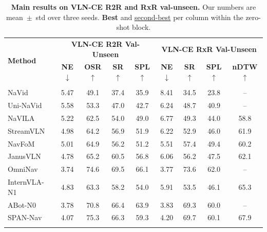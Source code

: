 \documentclass[conference]{IEEEtran}
\begin{document}
\begin{table}[t]
\centering
\caption{\textbf{Main results on VLN-CE R2R and RxR val-unseen.}
Our numbers are mean~$\pm$~std over three seeds.  \textbf{Best} and
\underline{second-best} per column within the
\colorbox{cyan!15}{zero-shot} block.}
\label{tab:vlnce}
\vspace{-6pt}
{\fontsize{8pt}{9pt}\selectfont
\setlength{\tabcolsep}{3pt}
\begin{tabular}{l|cccc|cccc}
\toprule
\multirow{2}{*}{\textbf{Method}} &
\multicolumn{4}{c|}{\textbf{VLN-CE R2R Val-Unseen}} &
\multicolumn{4}{c}{\textbf{VLN-CE RxR Val-Unseen}} \\
& \textbf{NE}$\downarrow$ & \textbf{OSR}$\uparrow$ &
\textbf{SR}$\uparrow$ & \textbf{SPL}$\uparrow$ &
\textbf{NE}$\downarrow$ & \textbf{SR}$\uparrow$ &
\textbf{SPL}$\uparrow$ & \textbf{nDTW}$\uparrow$ \\
\midrule
\rowcolor{black!15}\multicolumn{9}{c}{\textbf{Supervised Learning (Training Method)}} \\
NaVid~\cite{zhang2024navid}                         & 5.47 & 49.1 & 37.4 & 35.9 & 8.41 & 34.5 & 23.8 & --   \\
Uni-NaVid~\cite{zhang2024uninavid}                  & 5.58 & 53.3 & 47.0 & 42.7 & 6.24 & 48.7 & 40.9 & --   \\
NaVILA~\cite{cheng2024navila}                       & 5.22 & 62.5 & 54.0 & 49.0 & 6.77 & 49.3 & 44.0 & 58.8 \\
StreamVLN~\cite{wei2025streamvln}                   & 4.98 & 64.2 & 56.9 & 51.9 & 6.22 & 52.9 & 46.0 & 61.9 \\
NavFoM~\cite{zhang2025navfom}                       & 5.01 & 64.9 & 56.2 & 51.2 & 5.51 & 57.4 & 49.4 & 60.2 \\
JanusVLN~\cite{zeng2025janusvln}                    & 4.78 & 65.2 & 60.5 & 56.8 & 6.06 & 56.2 & 47.5 & 62.1 \\
OmniNav~\cite{xue2025omninav}                       & 3.74 & 74.6 & 69.5 & 66.1 & 3.77 & 73.6 & 62.0 & --   \\
InternVLA-N1~\cite{wei2025internvlan1}              & 4.83 & 63.3 & 58.2 & 54.0 & 5.91 & 53.5 & 46.1 & 65.3   \\
ABot-N0~\cite{chen2026abotn0}                       & 3.78 & 70.8 & 66.4 & 63.9 & 3.83 & 69.3 & 60.0 & -- \\
SPAN-Nav~\cite{liu2026spannav}                      & 4.07 & 75.3 & 66.3 & 59.3 & 4.20 & 69.7 & 60.1 & 67.9 \\
\midrule
\rowcolor{cyan!15}\multicolumn{9}{c}{\textbf{Zero-Shot (Training-Free)}} \\

\end{tabular}}
\end{table}
\end{document}
